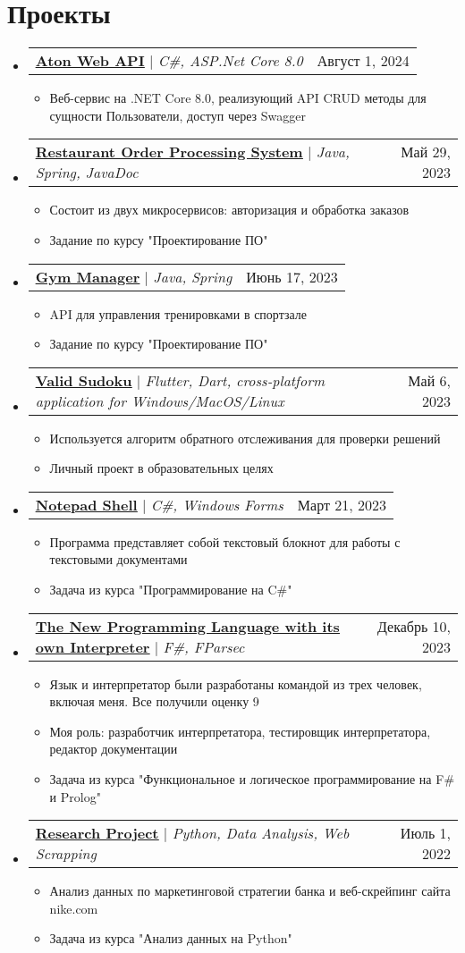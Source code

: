 \documentclass[letterpaper,11pt]{article}
\makeatletter
\newcommand{\resumeItem}[1]{
  \item\small{
    {#1 \vspace{-4pt}}
  }
}
\newcommand{\resumeProjectHeading}[2]{
    \item
    \begin{tabular*}{0.97\textwidth}{l@{\extracolsep{\fill}}r}
      \small#1 & #2 \\
    \end{tabular*}\vspace{-7pt}
}
\newcommand{\resumeSubHeadingListStart}{\begin{itemize}[leftmargin=0.15in, label={}]}
\newcommand{\resumeSubHeadingListEnd}{\end{itemize}}
\newcommand{\resumeItemListStart}{\begin{itemize}}
\newcommand{\resumeItemListEnd}{\end{itemize}\vspace{-5pt}}
\makeatother
\begin{document}
\section{Проекты}
    \resumeSubHeadingListStart
          \resumeProjectHeading
          {\href{https://github.com/lkhorasandzhian/aton-web-api}{\underline{\textbf{Aton Web API}}} $|$ \emph{C\#, ASP.Net Core 8.0}}{Август 1, 2024}
          \resumeItemListStart
            \resumeItem{Веб-сервис на .NET Core 8.0, реализующий API CRUD методы для сущности Пользователи, доступ через Swagger}
          \resumeItemListEnd
          \resumeProjectHeading
          {\href{https://github.com/lkhorasandzhian/restaurant-order-processing-system}{\underline{\textbf{Restaurant Order Processing System}}} $|$ \emph{Java, Spring, JavaDoc}}{Май 29, 2023}
          \resumeItemListStart
            \resumeItem{Состоит из двух микросервисов: авторизация и обработка заказов}
            \resumeItem{Задание по курсу "Проектирование ПО"}
          \resumeItemListEnd
          \resumeProjectHeading
          {\href{https://github.com/lkhorasandzhian/kpo-gym}{\underline{\textbf{Gym Manager}}} $|$ \emph{Java, Spring}}{Июнь 17, 2023}
          \resumeItemListStart
            \resumeItem{API для управления тренировками в спортзале}
            \resumeItem{Задание по курсу "Проектирование ПО"}
          \resumeItemListEnd
          \resumeProjectHeading
          {\href{https://github.com/lkhorasandzhian/valid_sudoku}{\underline{\textbf{Valid Sudoku}}} $|$ \emph{Flutter, Dart, cross-platform application for Windows/MacOS/Linux}}{Май 6, 2023}
          \resumeItemListStart
            \resumeItem{Используется алгоритм обратного отслеживания для проверки решений}
            \resumeItem{Личный проект в образовательных целях}
          \resumeItemListEnd
          \resumeProjectHeading
          {\href{https://github.com/lkhorasandzhian/notepad-shell}{\underline{\textbf{Notepad Shell}}} $|$ \emph{C\#, Windows Forms}}{Март 21, 2023}
          \resumeItemListStart
            \resumeItem{Программа представляет собой текстовый блокнот для работы с текстовыми документами}
            \resumeItem{Задача из курса "Программирование на C\#"}
          \resumeItemListEnd
          \resumeProjectHeading
          {\href{https://github.com/lkhorasandzhian/fp-compiler-lab-mosmetro}{\underline{\textbf{The New Programming Language with its own Interpreter}}} $|$ \emph{F\#, FParsec}}{Декабрь 10, 2023}
          \resumeItemListStart
            \resumeItem{Язык и интерпретатор были разработаны командой из трех человек, включая меня. Все получили оценку 9}
            \resumeItem{Моя роль: разработчик интерпретатора, тестировщик интерпретатора, редактор документации}
            \resumeItem{Задача из курса "Функциональное и логическое программирование на F\# и Prolog"}
          \resumeItemListEnd
          \resumeProjectHeading
          {\href{https://github.com/lkhorasandzhian/research-project}{\underline{\textbf{Research Project}}} $|$ \emph{Python, Data Analysis, Web Scrapping}}{Июль 1, 2022}
          \resumeItemListStart
            \resumeItem{Анализ данных по маркетинговой стратегии банка и веб-скрейпинг сайта nike.com}
            \resumeItem{Задача из курса "Анализ данных на Python"}
          \resumeItemListEnd
    \resumeSubHeadingListEnd
\end{document}
